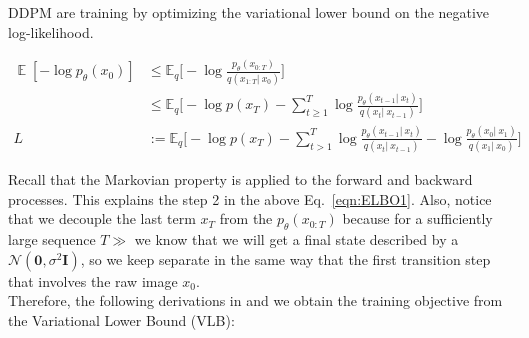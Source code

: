    DDPM are training by optimizing the variational lower bound
    on the negative log-likelihood.
    
    \begin{equation}\label{eqn:ELBO1}
    \begin{split} 
    \mathop{\mathbb{E}}[-\log p_{\theta}(x_{0})] & \leq \mathbb{E}_{q}\bigg[-\log \frac{p_{\theta}(x_{0:T})}{q(x_{1:T}|~x_{0})}\bigg] \\
    & \leq \mathbb{E}_{q}\bigg[-\log p(x_{T}) - \sum_{t\geq 1}^{T} \log\frac{p_{\theta}(x_{t-1}|~x_{t})}{q(x_{t}|~x_{t-1})} \bigg] \\
    L & := \mathbb{E}_{q}\bigg[-\log p(x_{T}) - \sum_{t>1}^{T} \log \frac{p_{\theta}(x_{t-1}|~x_{t})}{q(x_{t}|~x_{t-1})}-\log\frac{p_{\theta}(x_{0}|~x_{1})}{q(x_{1}|~x_{0})}\bigg]
    \end{split}
    \end{equation}
    
    Recall that the Markovian property is applied to the forward
    and backward processes. This explains the step 2 in the above
    Eq.~\ref{eqn:ELBO1}. Also, notice that we decouple the last term $x_{T}$ from the $p_{\theta}(x_{0:T})$ because
    for a sufficiently large sequence $T\gg$ we know that we will get a final state described by a $\mathcal{N}(\mathbf{0}, \sigma^2\mathbf{I})$, so we keep separate in the same way
    that the first transition step that involves the raw image $x_{0}$. \\
    
    Therefore, the following derivations in \cite{ho2020denoising}
    and \cite{sohldickstein2015deep} we obtain the training objective from the Variational Lower Bound (VLB):

